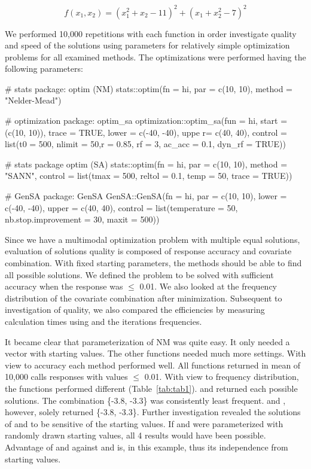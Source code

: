 \begin{equation}
\label{eq:eq2}
f(x_1,x_2)=(x_1^2+x_2-11)^2+(x_1+x_2^2-7)^2
\end{equation}

We performed 10,000 repetitions with each function in order investigate quality and speed of the solutions using parameters for relatively simple optimization problems for all examined methods. The optimizations were performed having the following parameters:
    
    \begin{example}
# stats package: optim (NM)
stats::optim(fn = hi, par = c(10, 10), method = "Nelder-Mead")

# optimization package: optim_sa
optimization::optim_sa(fun = hi, start = (c(10, 10)), trace = TRUE, 
                       lower = c(-40, -40), uppe r= c(40, 40),
                       control = list(t0 = 500, nlimit = 50,r = 0.85,
                                      rf = 3, ac_acc = 0.1, dyn_rf = TRUE))

# stats package optim (SA)
stats::optim(fn = hi, par = c(10, 10), method = "SANN",
             control = list(tmax = 500, reltol = 0.1, temp = 50, trace = TRUE))

# GenSA package: GenSA
GenSA::GenSA(fn = hi, par = c(10, 10), lower = c(-40, -40), upper = c(40, 40), 
             control = list(temperature = 50, nb.stop.improvement = 30, maxit = 500))
\end{example}
Since we have a multimodal optimization problem with multiple equal solutions, evaluation of solutions quality is composed of response accuracy and covariate combination. With fixed starting parameters, the methods should be able to find all possible solutions. We defined the problem to be solved with sufficient accuracy when the response was $\leq$ 0.01. We also looked at the frequency distribution of the covariate combination after minimization. Subsequent to investigation of quality, we also compared the efficiencies by measuring calculation times using  and the iterations frequencies.

It became clear that parameterization of NM was quite easy. It only needed a vector with starting values. The other functions needed much more settings. With view to accuracy each method performed well. All functions returned in mean of 10,000 calls responses with values $\leq$ 0.01. With view to frequency distribution, the functions performed different (Table~\ref{tab:tab1}).  and  returned each possible solutions.  The combination \{-3.8, -3.3\} was consistently least frequent.  and , however, solely returned \{-3.8, -3.3\}. Further investigation revealed the solutions of  and  to be sensitive of the starting values. If  and  were parameterized with randomly drawn starting values, all 4 results would have been possible. Advantage of  and  against  and  is, in this example, thus its independence from starting values.


